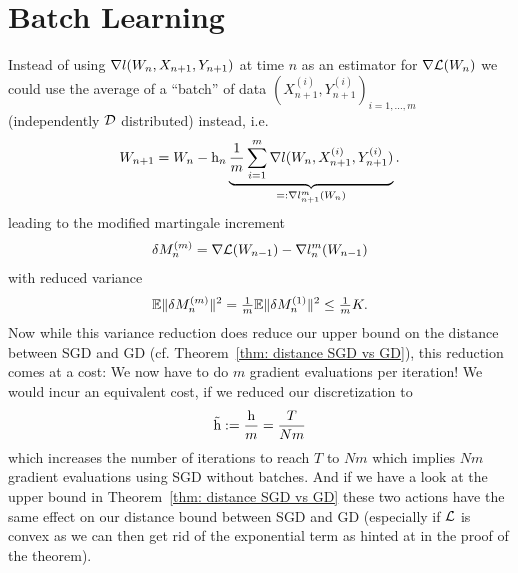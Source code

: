 \section{Batch Learning}

Instead of using \(\nabla l(W_n, X_{n+1}, Y_{n+1})\) at time \(n\) as an
estimator for \(\nabla\mathcal{L}(W_n)\) we could use the average of a
``batch'' of data \((X^{(i)}_{n+1}, Y^{(i)}_{n+1})_{i=1,\dots,m}\) (independently
\(\mathcal{D}\) distributed) instead, i.e.
\begin{align*}
	W_{n+1} = W_n
	-\text{h}_n \underbrace{\frac1{m}\sum_{i=1}^m\nabla l(W_n,X^{(i)}_{n+1}, Y^{(i)}_{n+1})}_{
		=:\nabla l_{n+1}^m(W_n)
	}.
\end{align*}
leading to the modified martingale increment
\begin{align*}
	\delta M_n^{(m)}
	= \nabla\mathcal{L}(W_{n-1})
	- \nabla l_n^m(W_{n-1})
\end{align*}
with reduced variance
\begin{align*}
	\mathbb{E}\|\delta M_n^{(m)}\|^2 = \tfrac1m\mathbb{E}\|\delta M_n^{(1)}\|^2 \le \tfrac1m K.
\end{align*}
Now while this variance reduction does reduce our upper bound on the distance
between SGD and GD (cf. Theorem~\ref{thm: distance SGD vs GD}), this reduction
comes at a cost: We now have to do \(m\) gradient evaluations per iteration!
We would incur an equivalent cost, if we reduced our discretization to
\begin{align*}
	\tilde{\text{h}}:=\frac{\text{h}}{m}=\frac{T}{Nm}
\end{align*}
which increases the number of iterations to reach \(T\) to \(Nm\) which implies
\(Nm\) gradient evaluations using SGD without batches. And if we have a look
at the upper bound in Theorem~\ref{thm: distance SGD vs GD} these two actions
have the same effect on our distance bound between SGD and GD (especially if
\(\mathcal{L}\) is convex as we can then get rid of the exponential term as hinted
at in the proof of the theorem).

